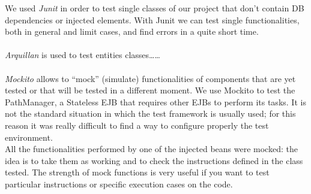 We used \textit{Junit} in order to test single classes of our project that don’t contain DB dependencies or injected elements. With Junit we can test single functionalities, both in general and limit cases, and find errors in a quite short time. \\\\
\textit{Arquillan} is used to test entities classes……  \\\\
\textit{Mockito} allows to “mock” (simulate) functionalities of components that are yet tested or that will be tested in a different moment. We use Mockito to test the PathManager, a Stateless EJB that requires other EJBs to perform its tasks. It is not the standard situation in which the test framework is usually used; for this reason it was really difficult to find a way to configure properly the test environment.\\
All the functionalities performed by one of the injected beans were mocked: the idea is to take them as working and to check the instructions defined in the class tested. The strength of mock functions is very useful if you want to test particular instructions or specific execution cases on the code. 
